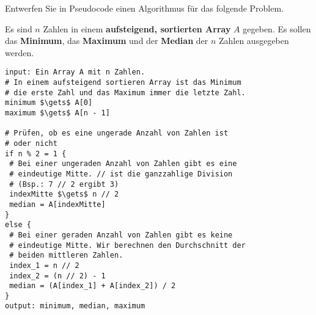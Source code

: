 %
%
Entwerfen Sie in Pseudocode einen Algorithmus für das folgende Problem.

\begin{problem}\label{problem-min-median-max-n-zahlen}
	Es sind $n$ Zahlen in einem \textbf{aufsteigend, sortierten Array} $A$ gegeben. Es sollen das \textbf{Minimum}, das \textbf{Maximum} und der \textbf{Median} der $n$ Zahlen ausgegeben werden.
\end{problem}
\begin{solution}
\begin{minipage}{\linewidth}
\begin{lstlisting}[language=pseudocode, caption={Algorithmus für das Problem \protect\autoref{problem-min-median-max-n-zahlen}}, label={lst-algo-min-median-max-n-zahlen}]
input: Ein Array A mit n Zahlen.
# In einem aufsteigend sortieren Array ist das Minimum
# die erste Zahl und das Maximum immer die letzte Zahl.
minimum $\gets$ A[0]
maximum $\gets$ A[n - 1]

# Prüfen, ob es eine ungerade Anzahl von Zahlen ist
# oder nicht
if n % 2 = 1 {
 # Bei einer ungeraden Anzahl von Zahlen gibt es eine
 # eindeutige Mitte. // ist die ganzzahlige Division
 # (Bsp.: 7 // 2 ergibt 3)
 indexMitte $\gets$ n // 2
 median = A[indexMitte]
}
else {
 # Bei einer geraden Anzahl von Zahlen gibt es keine
 # eindeutige Mitte. Wir berechnen den Durchschnitt der
 # beiden mittleren Zahlen.
 index_1 = n // 2
 index_2 = (n // 2) - 1
 median = (A[index_1] + A[index_2]) / 2
}
output: minimum, median, maximum
\end{lstlisting}
\end{minipage}
\end{solution}

\fillwithgrid	{3.5in}
